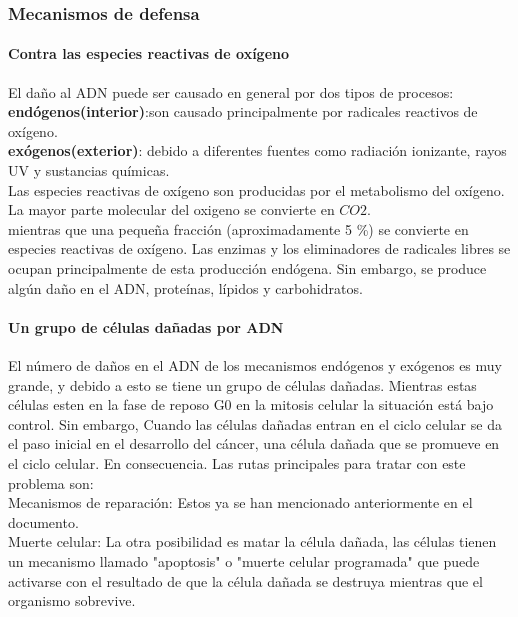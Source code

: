 

\subsubsection{Mecanismos de defensa}
\paragraph{Contra las especies reactivas de oxígeno}
El daño al ADN puede ser causado en general por dos tipos de procesos:\\
 \textbf{endógenos(interior)}:son causado principalmente por radicales reactivos de oxígeno.\\
 \textbf{exógenos(exterior)}: debido a diferentes fuentes como radiación ionizante, rayos UV y sustancias químicas.\\
Las especies reactivas de oxígeno  son producidas por el metabolismo del oxígeno. La mayor parte molecular del oxigeno se convierte en $CO2$.\\
mientras que una pequeña fracción (aproximadamente 5 \%) se convierte en especies reactivas de oxígeno. Las enzimas y los eliminadores de radicales libres se ocupan principalmente de esta producción endógena. Sin embargo, se produce algún daño en el ADN, proteínas, lípidos y carbohidratos\cite{Thormod}.

\paragraph{Un grupo de células dañadas por ADN}

El número de daños en el ADN de los mecanismos endógenos y exógenos es muy grande, y debido a esto se tiene un grupo de células dañadas. Mientras estas células esten en la fase de reposo G0 en la mitosis celular la situación está bajo control. Sin embargo, Cuando las células dañadas entran en el ciclo celular se da el paso inicial en el desarrollo del cáncer, una célula dañada que se promueve en el ciclo celular. En consecuencia. Las rutas principales para tratar con este problema son:\\
Mecanismos de reparación: Estos ya se han mencionado anteriormente en el documento.\\
Muerte celular: La otra posibilidad es matar la célula dañada, las células tienen un mecanismo llamado "apoptosis" o "muerte celular programada" que puede activarse con el resultado de que la célula dañada se destruya mientras que el organismo sobrevive\cite{Thormod}.

